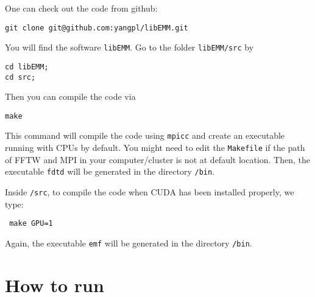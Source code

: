 \documentclass[10pt]{article}
\begin{document}
One can check out the code from github:
\begin{verbatim}
git clone git@github.com:yangpl/libEMM.git
\end{verbatim}
You will find the software \verb|libEMM|. Go to the folder \verb|libEMM/src| by
\begin{verbatim}
cd libEMM;
cd src;
\end{verbatim}
Then you can compile the code via
\begin{verbatim}
make
\end{verbatim}
This command will compile the code using \verb|mpicc| and create an executable running with CPUs by default. You might need to edit the \verb|Makefile| if the path of FFTW and MPI in your computer/cluster is not at default location. 
Then, the executable \texttt{fdtd} will be generated in the directory \texttt{/bin}. 

Inside \texttt{/src}, to compile the code when CUDA has been installed properly, we type:
\begin{verbatim}
 make GPU=1
\end{verbatim}
Again, the executable \texttt{emf} will be generated in the directory \texttt{/bin}. 


\section{How to run}
\end{document}

